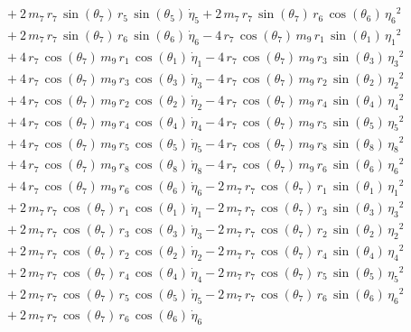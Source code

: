 \begin{eqnarray*}
 \\ &&\quad\mbox{} + 2\,m_{7}\,r_{7}\,\sin({\theta_{7}})\,r_{5}\,\sin(
{\theta_{5}})\,{\dot{\eta}_{5}} + 2\,m_{7}\,r_{7}\,\sin({\theta_{7}})
\,r_{6}\,\cos({\theta_{6}})\,{{\eta_{6}}}^2 \\ &&\quad\mbox{} + 2\,m_{
7}\,r_{7}\,\sin({\theta_{7}})\,r_{6}\,\sin({\theta_{6}})\,{\dot{\eta}
_{6}} - 4\,r_{7}\,\cos({\theta_{7}})\,m_{9}\,r_{1}\,\sin({\theta_{1}})
\,{{\eta_{1}}}^2 \\ &&\quad\mbox{} + 4\,r_{7}\,\cos({\theta_{7}})\,m_{
9}\,r_{1}\,\cos({\theta_{1}})\,{\dot{\eta}_{1}} - 4\,r_{7}\,\cos({
\theta_{7}})\,m_{9}\,r_{3}\,\sin({\theta_{3}})\,{{\eta_{3}}}^2
 \\ &&\quad\mbox{} + 4\,r_{7}\,\cos({\theta_{7}})\,m_{9}\,r_{3}\,\cos(
{\theta_{3}})\,{\dot{\eta}_{3}} - 4\,r_{7}\,\cos({\theta_{7}})\,m_{9}
\,r_{2}\,\sin({\theta_{2}})\,{{\eta_{2}}}^2 \\ &&\quad\mbox{} + 4\,r_{
7}\,\cos({\theta_{7}})\,m_{9}\,r_{2}\,\cos({\theta_{2}})\,{\dot{\eta}
_{2}} - 4\,r_{7}\,\cos({\theta_{7}})\,m_{9}\,r_{4}\,\sin({\theta_{4}})
\,{{\eta_{4}}}^2 \\ &&\quad\mbox{} + 4\,r_{7}\,\cos({\theta_{7}})\,m_{
9}\,r_{4}\,\cos({\theta_{4}})\,{\dot{\eta}_{4}} - 4\,r_{7}\,\cos({
\theta_{7}})\,m_{9}\,r_{5}\,\sin({\theta_{5}})\,{{\eta_{5}}}^2
 \\ &&\quad\mbox{} + 4\,r_{7}\,\cos({\theta_{7}})\,m_{9}\,r_{5}\,\cos(
{\theta_{5}})\,{\dot{\eta}_{5}} - 4\,r_{7}\,\cos({\theta_{7}})\,m_{9}
\,r_{8}\,\sin({\theta_{8}})\,{{\eta_{8}}}^2 \\ &&\quad\mbox{} + 4\,r_{
7}\,\cos({\theta_{7}})\,m_{9}\,r_{8}\,\cos({\theta_{8}})\,{\dot{\eta}
_{8}} - 4\,r_{7}\,\cos({\theta_{7}})\,m_{9}\,r_{6}\,\sin({\theta_{6}})
\,{{\eta_{6}}}^2 \\ &&\quad\mbox{} + 4\,r_{7}\,\cos({\theta_{7}})\,m_{
9}\,r_{6}\,\cos({\theta_{6}})\,{\dot{\eta}_{6}} - 2\,m_{7}\,r_{7}\,
\cos({\theta_{7}})\,r_{1}\,\sin({\theta_{1}})\,{{\eta_{1}}}^2
 \\ &&\quad\mbox{} + 2\,m_{7}\,r_{7}\,\cos({\theta_{7}})\,r_{1}\,\cos(
{\theta_{1}})\,{\dot{\eta}_{1}} - 2\,m_{7}\,r_{7}\,\cos({\theta_{7}})
\,r_{3}\,\sin({\theta_{3}})\,{{\eta_{3}}}^2 \\ &&\quad\mbox{} + 2\,m_{
7}\,r_{7}\,\cos({\theta_{7}})\,r_{3}\,\cos({\theta_{3}})\,{\dot{\eta}
_{3}} - 2\,m_{7}\,r_{7}\,\cos({\theta_{7}})\,r_{2}\,\sin({\theta_{2}})
\,{{\eta_{2}}}^2 \\ &&\quad\mbox{} + 2\,m_{7}\,r_{7}\,\cos({\theta_{7}
})\,r_{2}\,\cos({\theta_{2}})\,{\dot{\eta}_{2}} - 2\,m_{7}\,r_{7}\,
\cos({\theta_{7}})\,r_{4}\,\sin({\theta_{4}})\,{{\eta_{4}}}^2
 \\ &&\quad\mbox{} + 2\,m_{7}\,r_{7}\,\cos({\theta_{7}})\,r_{4}\,\cos(
{\theta_{4}})\,{\dot{\eta}_{4}} - 2\,m_{7}\,r_{7}\,\cos({\theta_{7}})
\,r_{5}\,\sin({\theta_{5}})\,{{\eta_{5}}}^2 \\ &&\quad\mbox{} + 2\,m_{
7}\,r_{7}\,\cos({\theta_{7}})\,r_{5}\,\cos({\theta_{5}})\,{\dot{\eta}
_{5}} - 2\,m_{7}\,r_{7}\,\cos({\theta_{7}})\,r_{6}\,\sin({\theta_{6}})
\,{{\eta_{6}}}^2 \\ &&\quad\mbox{} + 2\,m_{7}\,r_{7}\,\cos({\theta_{7}
})\,r_{6}\,\cos({\theta_{6}})\,{\dot{\eta}_{6}} \end{eqnarray*}
